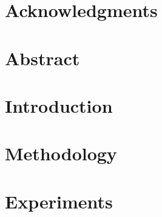 \documentclass[11pt]{book}
\renewcommand{\baselinestretch}{1.2}
\begin{document}



\newpage
\thispagestyle{empty}
\renewcommand{\thesisdedication}{{\large Copyright \copyright~~Vishva Saravanan Ramasubramanian, 2024\\}{\large All Rights Reserved\\}}
\thesisdedicationpage



\newpage
\thispagestyle{empty}
\renewcommand{\thesisdedication}{\large To my family and friends.}
\thesisdedicationpage

\mastersthesis
\renewcommand{\baselinestretch}{1.5}

\chapter*{Acknowledgments}
\label{ch:ack}


\chapter*{Abstract}
\label{ch:abstract}


\tableofcontents
\listoffigures
\listoftables

\chapter{Introduction}
\label{ch:intro}



\chapter{Methodology}
\label{ch:chap2}



\chapter{Experiments}
\label{ch:chap3}


\end{document}
